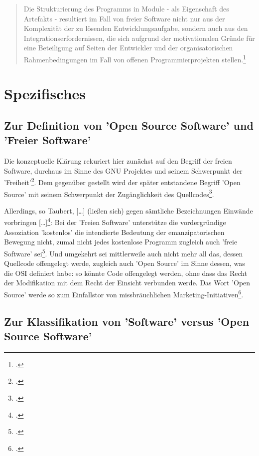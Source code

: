 \documentclass[DIV=calc,BCOR=5mm,11pt,headings=small,oneside,abstract=true, toc=bib]{scrartcl}
\begin{document}
\begin{quote}
\glqq{}Die Strukturierung des Programms in Module - als Eigenschaft des
Artefakts - resultiert im Fall von freier Software nicht nur aus der Komplexität
der zu lösenden Entwicklungsaufgabe, sondern auch aus den
Integrationserfordernissen, die sich aufgrund der motivationalen Gründe für eine
Beteiligung auf Seiten der Entwickler und der organisatorischen
Rahmenbedingungen im Fall von offenen Programmierprojekten
stellen.\grqq{}\footcite[][206]{Taubert2006a}
\end{quote}

\section{Spezifisches}
\subsection{Zur Definition von 'Open Source Software' und 'Freier Software'}
Die konzeptuelle Klärung rekuriert hier zunächst auf den Begriff der
\glqq{}freien Software\grqq{}, durchaus im Sinne des GNU Projektes und seinem
Schwerpunkt der 'Freiheit'\footcite[cf.][17]{Taubert2006a}.  Dem gegenüber
gestellt wird der später entstandene Begriff 'Open Source' mit seinem
Schwerpunkt der \glqq{}Zugänglichkeit des
Quellcodes\grqq{}\footcite[cf.][18]{Taubert2006a}.

Allerdings, so Taubert, \glqq{}[\ldots] (ließen sich) gegen sämtliche
Bezeichnungen Ein\-wände vorbringen
[\ldots]\grqq{}\footcite[cf.][19]{Taubert2006a}: Bei der 'Freien Software'
unterstütze die vordergründige Assoziation 'kostenlos' die intendierte Bedeutung
der \glqq{}emanzipatorischen Bewegung\grqq{} nicht, zumal nicht jedes kostenlose
Programm zugleich auch 'freie Software' sei\footcite[cf.][19]{Taubert2006a}.
Und umgekehrt sei mittlerweile auch nicht mehr all das, dessen Quellcode
offengelegt werde, zugleich auch 'Open Source' im Sinne dessen, was die OSI
definiert habe: so könnte Code offengelegt werden, ohne dass das Recht der
Modifikation mit dem Recht der Einsicht verbunden werde. Das Wort 'Open Source'
werde so zum \glqq{}Einfallstor\grqq{} von missbräuchlichen
\glqq{}Marketing-Initiativen\grqq{}\footcite[cf.][19f]{Taubert2006a}.

\subsection{Zur Klassifikation von 'Software' versus 'Open Source Software'}
\end{document}
